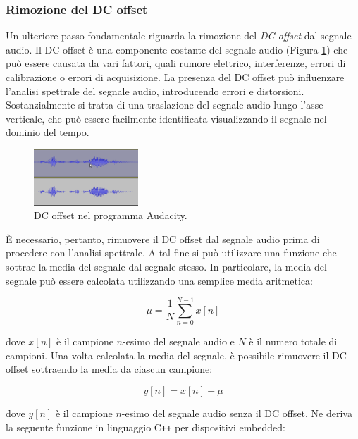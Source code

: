 \documentclass[a4paper,12pt]{report}  %
\begin{document}
\subsubsection{Rimozione del DC offset}\label{sec:dc_offset}
Un ulteriore passo fondamentale riguarda la rimozione del \textit{DC offset} dal segnale audio.
Il DC offset è una componente costante del segnale audio (Figura \ref{fig:dc_offset}) che può essere causata da vari fattori, quali rumore elettrico, interferenze, errori di calibrazione o errori di acquisizione.
La presenza del DC offset può influenzare l'analisi spettrale del segnale audio, introducendo errori e distorsioni.
Sostanzialmente si tratta di una traslazione del segnale audio lungo l'asse verticale, che può essere facilmente identificata visualizzando il segnale nel dominio del tempo.

\begin{figure}[h]
    \centering
    \includegraphics[width=0.35\textwidth]{imgs/dc_offset-audacity.png}
    \caption{DC offset nel programma Audacity.}
    \label{fig:dc_offset}
\end{figure}

È necessario, pertanto, rimuovere il DC offset dal segnale audio prima di procedere con l'analisi spettrale.
A tal fine si può utilizzare una funzione che sottrae la media del segnale dal segnale stesso.
In particolare, la media del segnale può essere calcolata utilizzando una semplice media aritmetica:

\begin{equation}
    \mu = \frac{1}{N} \sum_{n = 0}^{N - 1} x[n] \nonumber
\end{equation}

dove $x[n]$ è il campione $n$-esimo del segnale audio e $N$ è il numero totale di campioni.
Una volta calcolata la media del segnale, è possibile rimuovere il DC offset sottraendo la media da ciascun campione:

\begin{equation}
    y[n] = x[n] - \mu \nonumber
\end{equation}

dove $y[n]$ è il campione $n$-esimo del segnale audio senza il DC offset.
Ne deriva la seguente funzione in linguaggio C\texttt{++} per dispositivi embedded:
\end{document}
